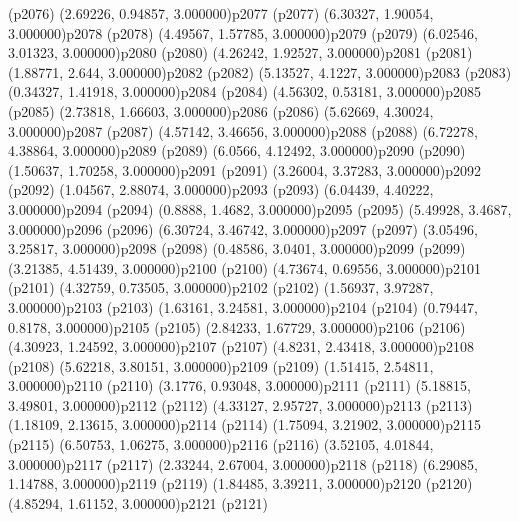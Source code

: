 \psdot(p2076)
\psPoint(2.69226, 0.94857, 3.000000){p2077}
\psdot(p2077)
\psPoint(6.30327, 1.90054, 3.000000){p2078}
\psdot(p2078)
\psPoint(4.49567, 1.57785, 3.000000){p2079}
\psdot(p2079)
\psPoint(6.02546, 3.01323, 3.000000){p2080}
\psdot(p2080)
\psPoint(4.26242, 1.92527, 3.000000){p2081}
\psdot(p2081)
\psPoint(1.88771, 2.644, 3.000000){p2082}
\psdot(p2082)
\psPoint(5.13527, 4.1227, 3.000000){p2083}
\psdot(p2083)
\psPoint(0.34327, 1.41918, 3.000000){p2084}
\psdot(p2084)
\psPoint(4.56302, 0.53181, 3.000000){p2085}
\psdot(p2085)
\psPoint(2.73818, 1.66603, 3.000000){p2086}
\psdot(p2086)
\psPoint(5.62669, 4.30024, 3.000000){p2087}
\psdot(p2087)
\psPoint(4.57142, 3.46656, 3.000000){p2088}
\psdot(p2088)
\psPoint(6.72278, 4.38864, 3.000000){p2089}
\psdot(p2089)
\psPoint(6.0566, 4.12492, 3.000000){p2090}
\psdot(p2090)
\psPoint(1.50637, 1.70258, 3.000000){p2091}
\psdot(p2091)
\psPoint(3.26004, 3.37283, 3.000000){p2092}
\psdot(p2092)
\psPoint(1.04567, 2.88074, 3.000000){p2093}
\psdot(p2093)
\psPoint(6.04439, 4.40222, 3.000000){p2094}
\psdot(p2094)
\psPoint(0.8888, 1.4682, 3.000000){p2095}
\psdot(p2095)
\psPoint(5.49928, 3.4687, 3.000000){p2096}
\psdot(p2096)
\psPoint(6.30724, 3.46742, 3.000000){p2097}
\psdot(p2097)
\psPoint(3.05496, 3.25817, 3.000000){p2098}
\psdot(p2098)
\psPoint(0.48586, 3.0401, 3.000000){p2099}
\psdot(p2099)
\psPoint(3.21385, 4.51439, 3.000000){p2100}
\psdot(p2100)
\psPoint(4.73674, 0.69556, 3.000000){p2101}
\psdot(p2101)
\psPoint(4.32759, 0.73505, 3.000000){p2102}
\psdot(p2102)
\psPoint(1.56937, 3.97287, 3.000000){p2103}
\psdot(p2103)
\psPoint(1.63161, 3.24581, 3.000000){p2104}
\psdot(p2104)
\psPoint(0.79447, 0.8178, 3.000000){p2105}
\psdot(p2105)
\psPoint(2.84233, 1.67729, 3.000000){p2106}
\psdot(p2106)
\psPoint(4.30923, 1.24592, 3.000000){p2107}
\psdot(p2107)
\psPoint(4.8231, 2.43418, 3.000000){p2108}
\psdot(p2108)
\psPoint(5.62218, 3.80151, 3.000000){p2109}
\psdot(p2109)
\psPoint(1.51415, 2.54811, 3.000000){p2110}
\psdot(p2110)
\psPoint(3.1776, 0.93048, 3.000000){p2111}
\psdot(p2111)
\psPoint(5.18815, 3.49801, 3.000000){p2112}
\psdot(p2112)
\psPoint(4.33127, 2.95727, 3.000000){p2113}
\psdot(p2113)
\psPoint(1.18109, 2.13615, 3.000000){p2114}
\psdot(p2114)
\psPoint(1.75094, 3.21902, 3.000000){p2115}
\psdot(p2115)
\psPoint(6.50753, 1.06275, 3.000000){p2116}
\psdot(p2116)
\psPoint(3.52105, 4.01844, 3.000000){p2117}
\psdot(p2117)
\psPoint(2.33244, 2.67004, 3.000000){p2118}
\psdot(p2118)
\psPoint(6.29085, 1.14788, 3.000000){p2119}
\psdot(p2119)
\psPoint(1.84485, 3.39211, 3.000000){p2120}
\psdot(p2120)
\psPoint(4.85294, 1.61152, 3.000000){p2121}
\psdot(p2121)
